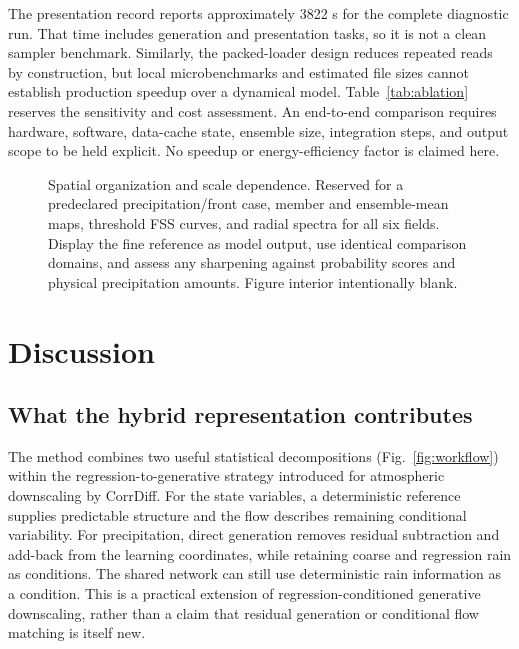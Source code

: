 \documentclass[10pt]{article}
\newcommand{\blankpanel}[1]{\begingroup\setlength{\fboxsep}{0pt}\color{rulegray}\fbox{\rule{0pt}{#1}\rule{\dimexpr\linewidth-2\fboxrule\relax}{0pt}}\endgroup}
\newcommand{\figslot}[3]{\begin{figure}[t]\centering\blankpanel{#1}\caption{#2}\label{#3}\end{figure}}
\newcommand{\tableslot}[3]{\begin{table}[t]\caption{#2}\label{#3}\centering\blankpanel{#1}\end{table}}
\begin{document}
The presentation record reports approximately 3822 s for the complete diagnostic run. That time includes generation and presentation tasks, so it is not a clean sampler benchmark. Similarly, the packed-loader design reduces repeated reads by construction, but local microbenchmarks and estimated file sizes cannot establish production speedup over a dynamical model. Table~\ref{tab:ablation} reserves the sensitivity and cost assessment. An end-to-end comparison requires hardware, software, data-cache state, ensemble size, integration steps, and output scope to be held explicit. No speedup or energy-efficiency factor is claimed here.

\figslot{4.0cm}{Spatial organization and scale dependence. Reserved for a predeclared precipitation/front case, member and ensemble-mean maps, threshold FSS curves, and radial spectra for all six fields. Display the fine reference as model output, use identical comparison domains, and assess any sharpening against probability scores and physical precipitation amounts. Figure interior intentionally blank.}{fig:spatial}

\tableslot{2.5cm}{Sensitivity and computational cost. Reserved for matched direct-versus-residual precipitation training, paired raw-versus-filtered ensembles, and experiments varying history, context, patch proposals, tile synchronization, and integration steps. Include precipitation organization and humidity-gradient diagnostics alongside CRPS, bias, and calibration. Include wall time per full-domain member, peak device/host memory, production training throughput, hardware, and storage. Leave unavailable experiments unreported rather than infer their effects from design intent. Table body intentionally blank.}{tab:ablation}

\section{Discussion}\label{sec:discussion}
\subsection{What the hybrid representation contributes}
The method combines two useful statistical decompositions (Fig.~\ref{fig:workflow}) within the regression-to-generative strategy introduced for atmospheric downscaling by CorrDiff. For the state variables, a deterministic reference supplies predictable structure and the flow describes remaining conditional variability. For precipitation, direct generation removes residual subtraction and add-back from the learning coordinates, while retaining coarse and regression rain as conditions. The shared network can still use deterministic rain information as a condition. This is a practical extension of regression-conditioned generative downscaling, rather than a claim that residual generation or conditional flow matching is itself new.
\end{document}
